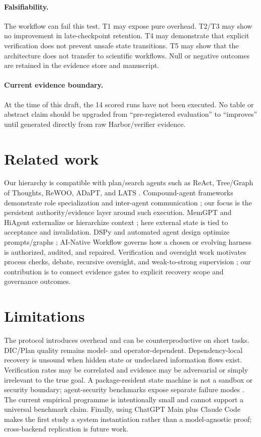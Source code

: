 \documentclass{article}
\begin{document}
\paragraph{Falsifiability.} The workflow can fail this test. T1 may expose pure overhead. T2/T3 may show no improvement in late-checkpoint retention. T4 may demonstrate that explicit verification does not prevent unsafe state transitions. T5 may show that the architecture does not transfer to scientific workflows. Null or negative outcomes are retained in the evidence store and manuscript.

\paragraph{Current evidence boundary.} At the time of this draft, the 14 scored runs have not been executed. No table or abstract claim should be upgraded from ``pre-registered evaluation'' to ``improves'' until generated directly from raw Harbor/verifier evidence.

\section{Related work}
Our hierarchy is compatible with plan/search agents such as ReAct, Tree/Graph of Thoughts, ReWOO, ADaPT, and LATS \citep{yao2023react,yao2023tot,besta2024got,xu2023rewoo,prasad2024adapt,zhou2024lats}. Compound-agent frameworks demonstrate role specialization and inter-agent communication \citep{wu2023autogen,li2023camel,chen2024agentverse,hong2024metagpt}; our focus is the persistent authority/evidence layer around such execution. MemGPT and HiAgent externalize or hierarchize context \citep{packer2023memgpt,wang2024hiagent}; here external state is tied to acceptance and invalidation. DSPy and automated agent design optimize prompts/graphs \citep{khattab2024dspy,hu2025adas}; AI-Native Workflow governs how a chosen or evolving harness is authorized, audited, and repaired. Verification and oversight work motivates process checks, debate, recursive oversight, and weak-to-strong supervision \citep{lightman2023verify,irving2018debate,leike2018recursive,burns2024weakstrong}; our contribution is to connect evidence gates to explicit recovery scope and governance outcomes.

\section{Limitations}
The protocol introduces overhead and can be counterproductive on short tasks. DIC/Plan quality remains model- and operator-dependent. Dependency-local recovery is unsound when hidden state or undeclared information flows exist. Verification rates may be correlated and evidence may be adversarial or simply irrelevant to the true goal. A package-resident state machine is not a sandbox or security boundary; agent-security benchmarks expose separate failure modes \citep{ruan2024toolemu,debenedetti2024agentdojo}. The current empirical programme is intentionally small and cannot support a universal benchmark claim. Finally, using ChatGPT Main plus Claude Code makes the first study a system instantiation rather than a model-agnostic proof; cross-backend replication is future work.
\end{document}
